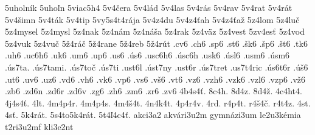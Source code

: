 {5uholník
5uhoľn
5viac5h4
5v4čera
5v4lád
5v4las
5v4rás
5v4rav
5v4rat
5v4rát
5v4šimn
5v4ták
5v4tip
5vy5s4t4rája
5v4z4du
5v4z4ťah
5v4z4ťaž
5z4lom
5z4luč
5z4mysel
5z4mysl
5z4nak
5z4nám
5z4náša
5z4rak
5z4väz
5z4vest
5zv4esť
5z4vod
5z4vuk
5z4vuč
5ž4ráč
5ž4rane
5ž4reb
5ž4rút
.cv6
.ch6
.sp6
.st6
.šk6
.šp6
.št6
.tk6
.uh6
.uc6h6
.uk6
.um6
.up6
.us6
.ús6
.usc6h6
.úsc6h
.usk6
.úsl6
.usm6
.úsm6
.ús7ta.
.ús7tami.
.ús7toč
.ús7ti
.ust6l
.úst7ny
.ust6r
.ús7tret
.us7t4ric
.ús6t6r
.úš6
.ut6
.uv6
.uz6
.vd6
.vh6
.vk6
.vp6
.vs6
.vš6
.vt6
.vz6
.vzh6
.vzk6
.vzl6
.vzp6
.vž6
.zb6
.zd6n
.zd6r
.zd6v
.zg6
.zh6
.zm6
.zr6
.zv6
4b4s4ť.
8c4h.
8d4z.
8d4ž.
4c4ht4.
4j4s4ť.
4lt.
4m4p4r.
4m4p4s.
4m4š4t.
4n4k4t.
4p4r4v.
4rd.
r4p4t.
r4š4č.
r4t4z.
4st.
4sť.
5k4rát.
5s4to5k4rát.
5t4ľ4c4ť.
akci3a2
akvári3u2m
gymnázi3um
le2u3kémia
t2ri3u2mf
kli3e2nt
}
%
%
